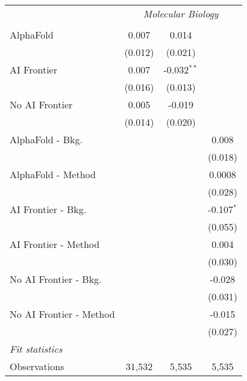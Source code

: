 \begin{tabular}{lccc}
 & \multicolumn{3}{c}{\textit{Molecular Biology}} \\ \\
   AlphaFold               & 0.007   & 0.014         &   \\   
                           & (0.012) & (0.021)       &   \\   
   AI Frontier             & 0.007   & -0.032$^{**}$ &   \\   
                           & (0.016) & (0.013)       &   \\   
   No AI Frontier          & 0.005   & -0.019        &   \\   
                           & (0.014) & (0.020)       &   \\   
   AlphaFold - Bkg.        &         &               & 0.008\\   
                           &         &               & (0.018)\\   
   AlphaFold - Method      &         &               & 0.0008\\   
                           &         &               & (0.028)\\   
   AI Frontier - Bkg.      &         &               & -0.107$^{*}$\\   
                           &         &               & (0.055)\\   
   AI Frontier - Method    &         &               & 0.004\\   
                           &         &               & (0.030)\\   
   No AI Frontier - Bkg.   &         &               & -0.028\\   
                           &         &               & (0.031)\\   
   No AI Frontier - Method &         &               & -0.015\\   
                           &         &               & (0.027)\\   
   \midrule
   \emph{Fit statistics}\\
   Observations            & 31,532  & 5,535         & 5,535\\  
   

\end{tabular}
